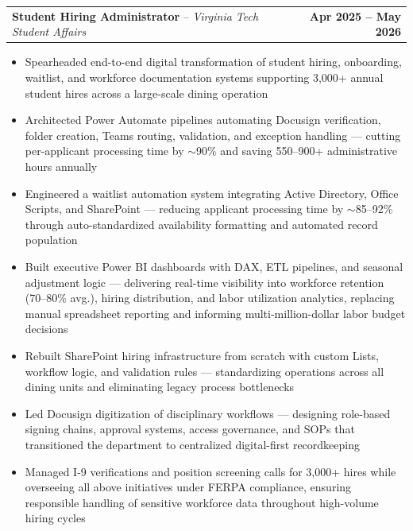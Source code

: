 \documentclass[letterpaper,11pt]{article}
\makeatletter
\newcommand{\resumeItem}[1]{
  \item\small{{#1 \vspace{-2pt}}}
}
\newcommand{\resumeSubheading}[4]{%
  \vspace{-2pt}\item
    \begin{tabular*}{1.0\textwidth}[t]{l@{\extracolsep{\fill}}r}
      \textbf{#1}{ -- }\textit{\small #3}%
      \ifthenelse{\equal{#4}{}}{}{, \textit{\small #4}}%
      & \textbf{\small #2} \\
    \end{tabular*}\vspace{-7pt}
}
\newcommand{\resumeItemListStart}{\begin{itemize}}
\newcommand{\resumeItemListEnd}{\end{itemize}\vspace{-5pt}}
\makeatother
\begin{document}
        \resumeSubheading
            {Student Hiring Administrator}
            {Apr 2025 -- May 2026}
            {Virginia Tech Student Affairs}
            {Blacksburg, VA}
            \resumeItemListStart
                \resumeItem{Spearheaded end-to-end digital transformation of student hiring, onboarding, waitlist, and workforce documentation systems supporting 3,000+ annual student hires across a large-scale dining operation}
                \resumeItem{Architected Power Automate pipelines automating Docusign verification, folder creation, Teams routing, validation, and exception handling --- cutting per-applicant processing time by ${\sim}$90\% and saving 550--900+ administrative hours annually}
                \resumeItem{Engineered a waitlist automation system integrating Active Directory, Office Scripts, and SharePoint --- reducing applicant processing time by ${\sim}$85--92\% through auto-standardized availability formatting and automated record population}
                \resumeItem{Built executive Power BI dashboards with DAX, ETL pipelines, and seasonal adjustment logic --- delivering real-time visibility into workforce retention (70--80\% avg.), hiring distribution, and labor utilization analytics, replacing manual spreadsheet reporting and informing multi-million-dollar labor budget decisions}
                \resumeItem{Rebuilt SharePoint hiring infrastructure from scratch with custom Lists, workflow logic, and validation rules --- standardizing operations across all dining units and eliminating legacy process bottlenecks}
                \resumeItem{Led Docusign digitization of disciplinary workflows --- designing role-based signing chains, approval systems, access governance, and SOPs that transitioned the department to centralized digital-first recordkeeping}
                \resumeItem{Managed I-9 verifications and position screening calls for 3,000+ hires while overseeing all above initiatives under FERPA compliance, ensuring responsible handling of sensitive workforce data throughout high-volume hiring cycles}
            \resumeItemListEnd
\end{document}
